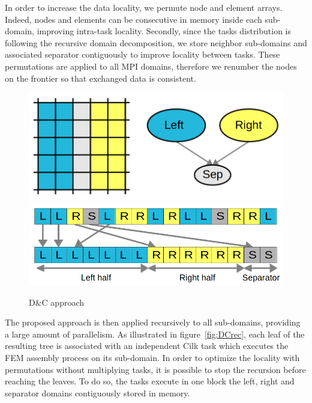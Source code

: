 \documentclass{IOS-Book-Article}
\begin{document}
In order to increase the data locality, we permute node and element arrays.
Indeed, nodes and elements can be consecutive in memory inside each sub-domain, improving intra-task locality.
Secondly, since the tasks distribution is following the recursive domain decomposition, we store neighbor sub-domains and associated separator contiguously
to improve locality between tasks.
These permutations are applied to all MPI domains, therefore we renumber the nodes on the frontier so that exchanged data is consistent.
\begin{figure}[htp]
 \centering
 \includegraphics[scale=0.17]{DC_approach.png}
 \includegraphics[scale=0.21]{Data_permutations.png}
 \caption{D\&C approach}
 \label{fig:DCapp}
\end{figure}

The proposed approach is then applied recursively to all sub-domains, providing a large amount of parallelism.
As illustrated in figure~\ref{fig:DCrec}, each leaf of the resulting tree is associated with an independent Cilk task which executes the FEM assembly process on its sub-domain.
In order to optimize the locality with permutations without multiplying tasks, it is possible to stop the recursion before reaching the leaves.
To do so, the tasks execute in one block the left, right and separator domains contiguously stored in memory.
\end{document}
